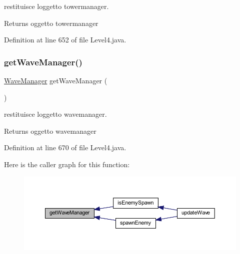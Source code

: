 restituisce l\textquotesingle{}oggetto towermanager. 

\begin{DoxyReturn}{Returns}
oggetto towermanager 
\end{DoxyReturn}


Definition at line 652 of file Level4.\+java.

\mbox{\label{classscenes_1_1_level4_a6b0fc6fbe769f38b9418fbaa51214735}} 
\subsubsection{\texorpdfstring{get\+Wave\+Manager()}{getWaveManager()}}
{\footnotesize\ttfamily \hyperlink{classmanagers_1_1_wave_manager}{Wave\+Manager} get\+Wave\+Manager (\begin{DoxyParamCaption}{ }\end{DoxyParamCaption})}



restituisce l\textquotesingle{}oggetto wavemanager. 

\begin{DoxyReturn}{Returns}
oggetto wavemanager 
\end{DoxyReturn}


Definition at line 670 of file Level4.\+java.

Here is the caller graph for this function\+:\nopagebreak
\begin{figure}[H]
\begin{center}
\leavevmode
\includegraphics[width=350pt]{classscenes_1_1_level4_a6b0fc6fbe769f38b9418fbaa51214735_icgraph}
\end{center}
\end{figure}
\mbox{\label{classscenes_1_1_level4_aded9c531b53772fd90d09a8b6bf0132e}} 
